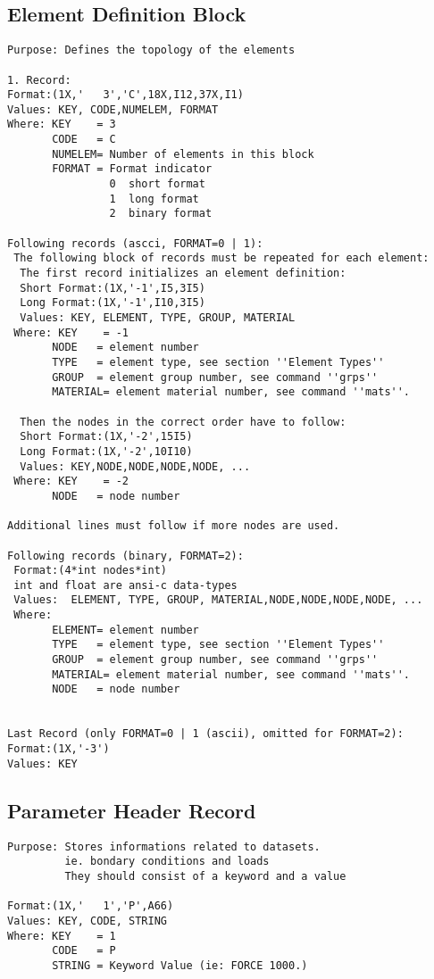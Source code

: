 \documentclass{article}
\begin{document}
\subsection{\label{Element Definition Block}Element Definition Block}
\begin{verbatim}
Purpose: Defines the topology of the elements

1. Record:
Format:(1X,'   3','C',18X,I12,37X,I1)
Values: KEY, CODE,NUMELEM, FORMAT
Where: KEY    = 3
       CODE   = C
       NUMELEM= Number of elements in this block
       FORMAT = Format indicator
                0  short format
                1  long format 
                2  binary format 

Following records (ascci, FORMAT=0 | 1):
 The following block of records must be repeated for each element:
  The first record initializes an element definition:
  Short Format:(1X,'-1',I5,3I5)
  Long Format:(1X,'-1',I10,3I5)
  Values: KEY, ELEMENT, TYPE, GROUP, MATERIAL
 Where: KEY    = -1
       NODE   = element number
       TYPE   = element type, see section ''Element Types''
       GROUP  = element group number, see command ''grps''
       MATERIAL= element material number, see command ''mats''.

  Then the nodes in the correct order have to follow:
  Short Format:(1X,'-2',15I5)
  Long Format:(1X,'-2',10I10)
  Values: KEY,NODE,NODE,NODE,NODE, ...
 Where: KEY    = -2
       NODE   = node number

Additional lines must follow if more nodes are used.

Following records (binary, FORMAT=2):
 Format:(4*int nodes*int)
 int and float are ansi-c data-types
 Values:  ELEMENT, TYPE, GROUP, MATERIAL,NODE,NODE,NODE,NODE, ...
 Where:
       ELEMENT= element number
       TYPE   = element type, see section ''Element Types''
       GROUP  = element group number, see command ''grps''
       MATERIAL= element material number, see command ''mats''.
       NODE   = node number
  
  
Last Record (only FORMAT=0 | 1 (ascii), omitted for FORMAT=2):
Format:(1X,'-3')
Values: KEY
\end{verbatim}

\subsection{\label{Parameter Header Record}Parameter Header Record}
\begin{verbatim}
Purpose: Stores informations related to datasets.
         ie. bondary conditions and loads
         They should consist of a keyword and a value

Format:(1X,'   1','P',A66)  
Values: KEY, CODE, STRING
Where: KEY    = 1
       CODE   = P
       STRING = Keyword Value (ie: FORCE 1000.)

\end{verbatim}
\end{document}
